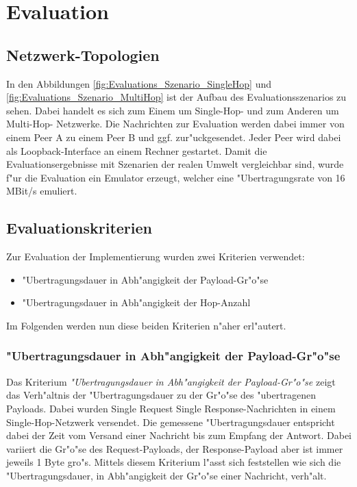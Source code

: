 \chapter{Evaluation}
\label{cha:evaluation}

\section{Netzwerk-Topologien}
In den Abbildungen \ref{fig:Evaluations_Szenario_SingleHop} und \ref{fig:Evaluations_Szenario_MultiHop} ist der Aufbau des Evaluationsszenarios zu sehen. Dabei handelt es sich zum Einem um Single-Hop- und zum Anderen um Multi-Hop- Netzwerke. Die Nachrichten zur Evaluation werden dabei immer von einem Peer A zu einem Peer B und ggf. zur"uckgesendet. Jeder Peer wird dabei als Loopback-Interface an einem Rechner gestartet. Damit die Evaluationsergebnisse mit Szenarien der realen Umwelt vergleichbar sind, wurde f"ur die Evaluation ein Emulator erzeugt, welcher eine "Ubertragungsrate von 16 MBit/s emuliert.

\section{Evaluationskriterien}
Zur Evaluation der Implementierung wurden zwei Kriterien verwendet:
\begin{itemize}
\item "Ubertragungsdauer in Abh"angigkeit der Payload-Gr"o"se
\item "Ubertragungsdauer in Abh"angigkeit der Hop-Anzahl
\end{itemize}
Im Folgenden werden nun diese beiden Kriterien n"aher erl"autert.

\subsection{"Ubertragungsdauer in Abh"angigkeit der Payload-Gr"o"se}
Das Kriterium \emph{"Ubertragungsdauer in Abh"angigkeit der Payload-Gr"o"se} zeigt das Verh"altnis der "Ubertragungsdauer zu der Gr"o"se des "ubertragenen Payloads. Dabei wurden Single Request Single Response-Nachrichten in einem Single-Hop-Netzwerk versendet. Die gemessene "Ubertragungsdauer entspricht dabei der Zeit vom Versand einer Nachricht bis zum Empfang der Antwort. Dabei variiert die Gr"o"se des Request-Payloads, der Response-Payload aber ist immer jeweils 1 Byte gro"s. Mittels diesem Kriterium l"asst sich feststellen wie sich die "Ubertragungsdauer, in Abh"angigkeit der Gr"o"se einer Nachricht, verh"alt.


